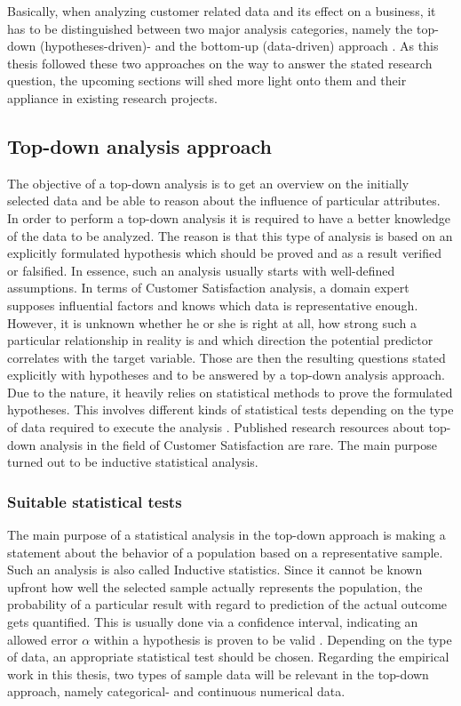 Basically, when analyzing customer related data and its effect on a business, it has to be distinguished between two major analysis categories, namely the top-down (hypotheses-driven)- and the bottom-up (data-driven) approach \cite{neckel2015}. As this thesis followed these two approaches on the way to answer the stated research question, the upcoming sections will shed more light onto them and their appliance in existing research projects.

\subsection{Top-down analysis approach}
\label{ssec:topDown}
The objective of a top-down analysis is to get an overview on the initially selected data and be able to reason about the influence of particular attributes. In order to perform a top-down analysis it is required to have a better knowledge of the data to be analyzed. The reason is that this type of analysis is based on an explicitly formulated hypothesis which should be proved and as a result verified or falsified. In essence, such an analysis usually starts with well-defined assumptions. In terms of Customer Satisfaction analysis, a domain expert supposes influential factors and knows which data is representative enough. However, it is unknown whether he or she is right at all, how strong such a particular relationship in reality is and which direction the potential predictor correlates with the target variable. Those are then the resulting questions stated explicitly with hypotheses and to be answered by a top-down analysis approach. Due to the nature, it heavily relies on statistical methods to prove the formulated hypotheses. This involves different kinds of statistical tests depending on the type of data required to execute the analysis \cite{neckel2015}. Published research resources about top-down analysis in the field of Customer Satisfaction are rare. The main purpose turned out to be inductive statistical analysis. 

\subsubsection{Suitable statistical tests}
The main purpose of a statistical analysis in the top-down approach is making a statement about the behavior of a population based on a representative sample. Such an analysis is also called Inductive statistics. Since it cannot be known upfront how well the selected sample actually represents the population, the probability of a particular result with regard to prediction of the actual outcome gets quantified. This is usually done via a confidence interval, indicating an allowed error $\alpha$ within a hypothesis is proven to be valid \cite{oestreich2009keine}. Depending on the type of data, an appropriate statistical test should be chosen. Regarding the empirical work in this thesis, two types of sample data will be relevant in the top-down approach, namely categorical- and continuous numerical data. 

